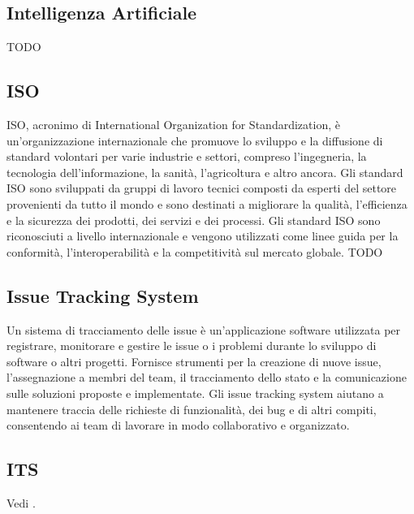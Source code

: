 \subsection*{Intelligenza Artificiale}
TODO

\vspace{2em}
\subsection*{ISO}
ISO, acronimo di International Organization for Standardization, è un'organizzazione internazionale che promuove lo sviluppo e la diffusione di standard volontari per varie industrie e settori, compreso l'ingegneria, la tecnologia dell'informazione, la sanità, l'agricoltura e altro ancora. Gli standard ISO sono sviluppati da gruppi di lavoro tecnici composti da esperti del settore provenienti da tutto il mondo e sono destinati a migliorare la qualità, l'efficienza e la sicurezza dei prodotti, dei servizi e dei processi. Gli standard ISO sono riconosciuti a livello internazionale e vengono utilizzati come linee guida per la conformità, l'interoperabilità e la competitività sul mercato globale.
TODO

\vspace{2em}
\subsection*{Issue Tracking System}
Un sistema di tracciamento delle issue è un'applicazione software utilizzata per registrare, monitorare e gestire le issue o i problemi durante lo sviluppo di software o altri progetti. Fornisce strumenti per la creazione di nuove issue, l'assegnazione a membri del team, il tracciamento dello stato e la comunicazione sulle soluzioni proposte e implementate. Gli issue tracking system aiutano a mantenere traccia delle richieste di funzionalità, dei bug e di altri compiti, consentendo ai team di lavorare in modo collaborativo e organizzato.

\vspace{2em}
\subsection*{ITS}
\par Vedi .
